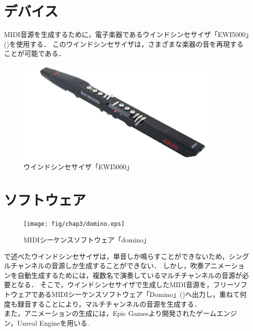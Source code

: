 \section{デバイス} \label{sec:device}
MIDI音源を生成するために，電子楽器であるウインドシンセサイザ「EWI5000」()を使用する．
このウインドシンセサイザは，さまざまな楽器の音を再現することが可能である．
\begin{figure}[h]
	\centering
	\includegraphics[width=10cm]{fig/chap3/ewi.eps}
	\caption{ウインドシンセサイザ「EWI5000」}
	\label{fig:ewi}
\end{figure}

\section{ソフトウェア} \label{sec:software}
\begin{figure}[h]
	\centering
	\texttt{[image: fig/chap3/domino.eps]}
	\caption{MIDIシーケンスソフトウェア「domino」}
	\label{fig:domino}
\end{figure}
で述べたウインドシンセサイザは，単音しか鳴らすことができないため，シングルチャンネルの音源しか生成することができない．
しかし，吹奏アニメーションを自動生成するためには，複数名で演奏しているマルチチャンネルの音源が必要となる．
そこで，ウインドシンセサイザで生成したMIDI音源を，フリーソフトウェアであるMIDIシーケンスソフトウェア「Domino」()\cite{domino}へ出力し，重ねて何度も録音することにより，マルチチャンネルの音源を生成する．\\
\indent
また，アニメーションの生成には，Epic Gamesより開発されたゲームエンジン，Unreal Engine\cite{ue4}を用いる.

